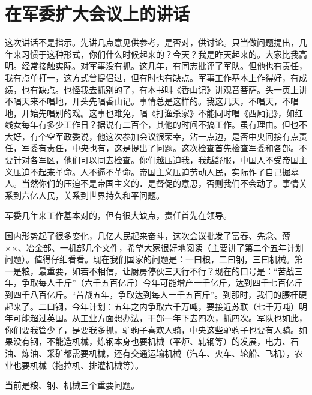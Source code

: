 \section[在军委扩大会议上的讲话（一九五八年六月二十一日）]{在军委扩大会议上的讲话}


这次讲话不是指示。先讲几点意见供参考，是否对，供讨论。只当做问题提出，几年来习惯于这种形式，你们什么时候起来的？今天？我是昨天起来的。大家比我高明。经常接触实际。对军事没有抓。这几年，有同志批评了军队。但他也有责任，我有点单打一，这方式曾提倡过，但有时也有缺点。军事工作基本上作得好，有成绩，也有缺点。也怪我去抓别的了，有本书叫《香山记》讲观音菩萨。头一页上讲不唱天来不唱地，开头先唱香山记。事情总是这样的。我这几天，不唱天，不唱地，开始先唱别的戏。这事也难免，唱《打渔杀家》不能同时唱《西厢记》，如红线女每年有多少工作日？据说有二百个，其他的时间不搞工作。虽有理由。但也不大好，有个空军政委说，他这次参加会议很荣幸，沾一点边，是否中央间接有点责任，军委有责任，中央也有，这是提出了问题。这次检查首先检查军委和各部。不要针对各军区，他们可以同去检查。你们越压迫我，我越舒服，中国人不受帝国主义压迫不起来革命。人不逼不革命。帝国主义压迫劳动人民，实际作了自己掘墓人。当然你们的压迫不是帝国主义的．是督促的意思，否则我们不会动了。事情关系到六亿人民，关系到世界持久和平问题。

军委几年来工作基本对的，但有很大缺点，责任首先在领导。

国内形势起了很多变化，几亿人民起来奋斗，这次会议批发了富春、先念、薄××、冶金部、一机部几个文件，希望大家很好地阅读（主要讲了第二个五年计划问题）。值得仔细看看。现在我们国家的问题是：一曰粮，二曰钢，三曰机械。第一是粮，最重要，如若不相信，让厨房停伙三天行不行？现在的口号是：“苦战三年，争取每人千斤”（六千五百亿斤）今年可能增产一千亿斤，达到四千七百亿斤到四千八百亿斤。“苦战五年，争取达到每人一千五百斤”。到那时，我们的腰杆硬起来了。二曰钢，今年计划：五年之内争取六千万吨，要接近苏联（七千万吨）明年可能超过英国。从工业方面想办法，干部一年下去四次，抓四次。军队也如此，你们要我管少了，是要我多抓，驴驹子喜欢人骑，中央这些驴驹子也要有人骑。如果没有钢，不能造机械，炼钢本身也要机械（平炉、轧钢等）的发展，电力、石油、炼油、采矿都需要机械，还有交通运输机械（汽车、火车、轮船、飞机），农业也要机械（拖拉机、排灌机械等）。

当前是粮、钢、机械三个重要问题。

